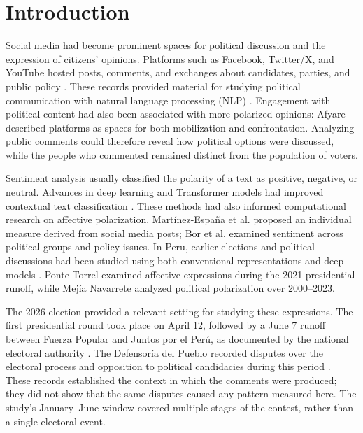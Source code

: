 \documentclass[conference, letterpaper]{IEEEtran}
\begin{document}
%
\IEEEpeerreviewmaketitle



\section{Introduction}

Social media had become prominent spaces for political discussion and the expression of citizens' opinions. 
Platforms such as Facebook, Twitter/X, and YouTube hosted posts, comments, and exchanges about candidates, 
parties, and public policy \cite{statista2026}. These records provided material for studying political 
communication with natural language processing (NLP) \cite{ref1}. Engagement with political content had also 
been associated with more polarized opinions: Afyare \cite{afyare2025socialmedia} described platforms as spaces 
for both mobilization and confrontation. Analyzing public comments could therefore reveal how political options 
were discussed, while the people who commented remained distinct from the population of voters.

Sentiment analysis usually classified the polarity of a text as positive, negative, or neutral. Advances in 
deep learning and Transformer models had improved contextual text classification \cite{Singh2026}. These 
methods had also informed computational research on affective polarization. Martínez-España et al. \cite{polariz} proposed an individual measure derived from social media posts; Bor et al. \cite{bor2023} examined sentiment across political groups and policy issues. In Peru, earlier elections and political discussions had been studied using both conventional representations and deep models \cite{Ayma2024,Carrera2026}. Ponte Torrel \cite{Ponte2022} examined affective expressions during the 2021 presidential runoff, while Mejía Navarrete \cite{Mejia2024} analyzed political polarization over 2000--2023.

The 2026 election provided a relevant setting for studying these expressions. The first presidential round took place on April 12, followed by a June 7 runoff between Fuerza Popular and Juntos por el Perú, as documented by the national electoral authority \cite{JNE11352026}. The Defensoría del Pueblo recorded disputes over the electoral process and opposition to political candidacies during this period \cite{Defensoria2842026}. These records established the context in which the comments were produced; they did not show that the same disputes caused any pattern measured here. The study's January--June window covered multiple stages of the contest, rather than a single electoral event.
\end{document}
